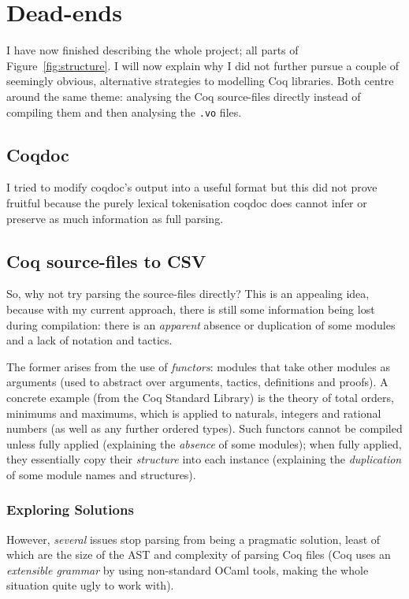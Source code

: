 \section{Dead-ends}

I have now finished describing the whole project; all parts of
Figure~\ref{fig:structure}. I will now explain why I did not further pursue a
couple of seemingly obvious, alternative strategies to modelling Coq libraries.
Both centre around the same theme: analysing the Coq source-files directly
instead of compiling them and then analysing the \texttt{.vo} files.


\subsection{Coqdoc}

I tried to modify coqdoc's output into a useful format but this did not prove
fruitful because the purely lexical tokenisation coqdoc does cannot infer or
preserve as much information as full parsing.

\subsection{Coq source-files to CSV}

So, why not try parsing the source-files directly? This is an appealing idea,
because with my current approach, there is still some information being lost
during compilation: there is an \emph{apparent} absence or duplication of some
modules and a lack of notation and tactics.

The former arises from the use of \emph{functors}: modules that take other
modules as arguments (used to abstract over arguments, tactics, definitions and
proofs). A concrete example (from the Coq Standard Library) is the theory of
total orders, minimums and maximums, which is applied to naturals, integers and
rational numbers (as well as any further ordered types). Such functors cannot be
compiled unless fully applied (explaining the \emph{absence} of some modules);
when fully applied, they essentially copy their \emph{structure} into each
instance (explaining the \emph{duplication} of some module names and
structures).

\subsubsection{Exploring Solutions}

However, \emph{several} issues stop parsing from being a pragmatic solution,
least of which are the size of the AST and complexity of parsing Coq files (Coq
uses an \emph{extensible grammar} by using non-standard OCaml tools, making the
whole situation quite ugly to work with).

